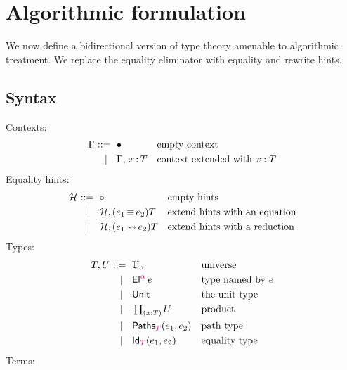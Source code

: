 \documentclass{article}
\begin{document}
\section{Algorithmic formulation}
\label{sec:bidir-type-theory}

We now define a bidirectional version of type theory amenable to algorithmic treatment. We
replace the equality eliminator with equality and rewrite hints.

\subsection{Syntax}
\label{sec:syntax-bidirectional}

Contexts:
%
\begin{equation*}
  \Gamma
  \begin{aligned}[t]
    \ \mathrel{{:}{:}{=}}\    {}& \bullet & & \text{empty context}\\
    \ \mid\ \  {}& \Gamma,\, x\, {:}\, T & & \text{context extended with $x : T$}
  \end{aligned}
\end{equation*}
%
Equality hints:
%
\begin{equation*}
  \mathcal{H}
  \begin{aligned}[t]
    \ \mathrel{{:}{:}{=}}\    {}& \circ & & \text{empty hints}\\
    \ \mid\ \  {}& \mathcal{H}, (e_1 \,{\equiv}\, e_2){T} & & \text{extend hints with an equation} \\
    \ \mid\ \  {}& \mathcal{H}, (e_1 \,{\leadsto}\, e_2){T} & & \text{extend hints with a reduction} \\
  \end{aligned}
\end{equation*}
%
Types:
%
\begin{equation*}
  T, U
  \begin{aligned}[t]
    \ \mathrel{{:}{:}{=}}\    {}& \mathbb{U}_{\alpha} & & \text{universe}\\
    \ \mid\ \  {}& \mathsf{El}^{{\color{magenta}{\alpha}}}\, e & & \text{type named by $e$}\\
    \ \mid\ \  {}& \mathsf{Unit} & & \text{the unit type}\\
    \ \mid\ \  {}& \mathop{\textstyle\prod_{(x {:} T)}} U & & \text{product}\\
    \ \mid\ \  {}& \mathsf{Paths}_{{\color{magenta}{T}}}(e_1,e_2) & & \text{path type}\\
    \ \mid\ \  {}& \mathsf{Id}_{{\color{magenta}{T}}}(e_1,e_2) & & \text{equality type}
  \end{aligned}
\end{equation*}
%
Terms:
%
\end{document}
